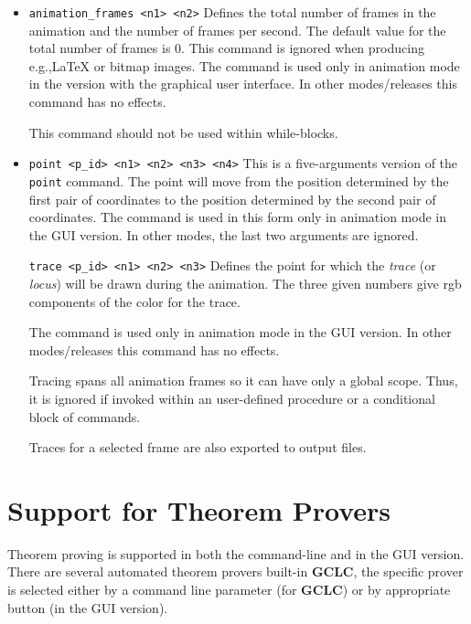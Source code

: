 \documentclass[a4paper]{book}
\newcommand{\gclc}{{\bfseries GCLC}\xspace}
\begin{document}
\begin{itemize}
\item
\verb|animation_frames <n1> <n2>|
        Defines the total number of frames in the animation and the
        number of frames per second. The default value for the total
        number of frames is 0.
        This command is ignored when producing e.g.,\LaTeX{} or bitmap images.
        The command is used only in animation mode in the version with the 
        graphical user interface.
        In other modes/releases this command has no effects.

        This command should not be used within while-blocks.

\item \verb|point <p_id> <n1> <n2> <n3> <n4>|
        This is a five-arguments version of the \verb|point| command.
        The point will move from the position determined by the first
        pair of coordinates to the position determined by the
        second pair of coordinates.
        The command is used in this form only in animation mode in
        the GUI version. In other modes, the last two arguments
        are ignored.

\verb|trace <p_id> <n1> <n2> <n3>|
        Defines the point for which the {\em trace} (or {\em locus})
        will be drawn during the animation. The three given numbers
        give {\sc rgb} components of the color for the trace.

        The command is used only in animation mode in the GUI 
        version. In other modes/releases this command has no effects.

        Tracing spans all animation frames so it can have only a
        global scope. Thus, it is ignored if invoked within an
        user-defined procedure or a conditional block of commands.

        Traces for a selected frame are also exported to output files.
\end{itemize}



\section{Support for Theorem Provers}
\label{subsec:prover-commands}

Theorem proving is supported in both the command-line and in the GUI version.
There are several automated theorem provers built-in \gclc{},
the specific prover is selected either by a command line
parameter (for \gclc{}) or by appropriate button (in the GUI version).
\end{document}
